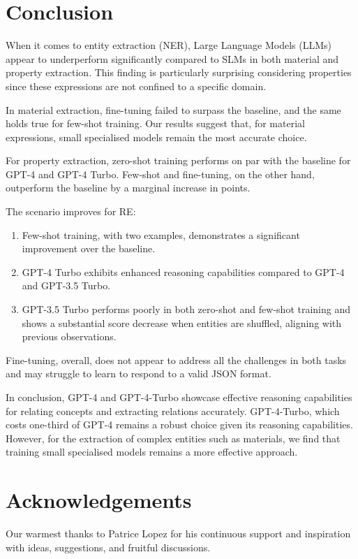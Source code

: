 \documentclass[a4paper]{article}
\begin{document}
\section{Conclusion}

When it comes to entity extraction (NER), Large Language Models (LLMs) appear to underperform significantly compared to SLMs in both material and property extraction. 
This finding is particularly surprising considering properties since these expressions are not confined to a specific domain.

In material extraction, fine-tuning failed to surpass the baseline, and the same holds true for few-shot training. Our results suggest that, for material expressions, small specialised models remain the most accurate choice.

For property extraction, zero-shot training performs on par with the baseline for GPT-4 and GPT-4 Turbo. Few-shot and fine-tuning, on the other hand, outperform the baseline by a marginal increase in points.

The scenario improves for RE:
\begin{enumerate}
\item Few-shot training, with two examples, demonstrates a significant improvement over the baseline.
\item GPT-4 Turbo exhibits enhanced reasoning capabilities compared to GPT-4 and GPT-3.5 Turbo.
\item GPT-3.5 Turbo performs poorly in both zero-shot and few-shot training and shows a substantial score decrease when entities are shuffled, aligning with previous observations.
\end{enumerate}
    
Fine-tuning, overall, does not appear to address all the challenges in both tasks and may struggle to learn to respond to a valid JSON format.

In conclusion, GPT-4 and GPT-4-Turbo showcase effective reasoning capabilities for relating concepts and extracting relations accurately. 
GPT-4-Turbo, which costs one-third of GPT-4 remains a robust choice given its reasoning capabilities. 
However, for the extraction of complex entities such as materials, we find that training small specialised models remains a more effective approach.

\section*{Acknowledgements}
Our warmest thanks to Patrice Lopez for his continuous support and inspiration with ideas, suggestions, and fruitful discussions.
\end{document}

